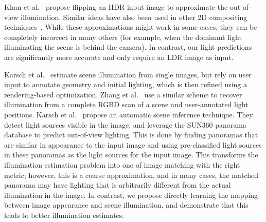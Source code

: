 Khan et al.~ propose flipping an HDR input image to approximate the out-of-view illumination. Similar ideas have also been used in other 2D compositing techniques~\cite{bitouk-sig-08,lalonde-sig-07}. While these approximations might work in some cases, they can be completely incorrect in many others (for example, when the dominant light illuminating the scene is behind the camera). In contrast, our light predictions are significantly more accurate and only require an LDR image as input.

Karsch et al.~ estimate scene illumination from single images, but rely on user input to annotate geometry and initial lighting, which is then refined using a rendering-based optimization. %
Zhang et al.~ use a similar scheme to recover illumination from a complete RGBD scan of a scene and user-annotated light positions. Karsch et al.~ propose an automatic scene inference technique. They detect light sources visible in the image, and leverage the SUN360 panorama database to predict out-of-view lighting. This is done by finding panoramas that are similar in appearance to the input image and using pre-classified light sources in these panoramas as the light sources for the input image. This transforms the illumination estimation problem into one of image matching with the right metric; however, this is a coarse approximation, and in many cases, the matched panorama may have lighting that is arbitrarily different from the actual illumination in the image. In contrast, we propose directly learning the mapping between image appearance and scene illumination, and demonstrate that this leads to better illumination estimates.


